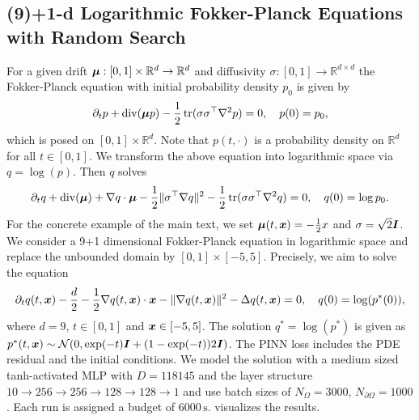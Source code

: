 \subsection{(9)+1-d Logarithmic Fokker-Planck Equations with Random Search}\label{sec:fokker10d-appendix}
For a given drift ${\bm{\mu}}: [0, 1]\times \mathbb R^d \to \mathbb R^d$ and diffusivity $\sigma:[0,1]\to\mathbb R^{d\times d}$
the Fokker-Planck equation with initial probability density $p_0$ is given by
\begin{equation*}
  \partial_t p 
  +
  \operatorname{div}({\bm{\mu}} p) 
  -
  \frac12\operatorname{tr}(\sigma \sigma^\top \nabla^2 p) 
  =
  0,
  \quad
  p(0)
  =
  p_0,
\end{equation*}
which is posed on $[0, 1]\times \mathbb R^d$.
Note that $p(t,\cdot)$ is a probability density on $\mathbb R^d$ for all $t\in[0,1]$. We transform the above equation into logarithmic 
space via $q=\log(p)$. Then $q$ solves
\begin{equation*}
  \partial_t q 
  + 
  \operatorname{div}({\bm{\mu}})
  +
  \nabla q \cdot {\bm{\mu}}
  -
  \frac12 \|\sigma^\top \nabla q\|^2
  -
  \frac12\operatorname{tr}(\sigma\sigma^\top\nabla^2q)
  =
  0,
  \quad
  q(0)
  =
  \log p_0.
\end{equation*}
For the concrete example of the main text, we set ${\bm{\mu}}(t, {\bm{x}})=-\frac12x$ and $\sigma = \sqrt{2}{\bm{I}}$. 
We consider a 9+1 dimensional Fokker-Planck equation in logarithmic space and replace the unbounded 
domain by $[0, 1]\times [-5, 5]$. Precisely, we aim to solve the 
equation
\begin{equation*}
  \partial_t q(t, {\bm{x}})
  -
  \frac{d}{2}
  -
  \frac12 \nabla q(t, {\bm{x}})\cdot {\bm{x}}
  -
  \| \nabla q(t, {\bm{x}}) \|^2
  -
  \Delta q(t, {\bm{x}})
  =
  0,
  \quad 
  q(0) = \log (p^*(0)),
\end{equation*}
where $d=9$, $t\in[0, 1]$ and ${\bm{x}}\in[-5, 5]$. The solution $q^*=\log(p^*)$ is
given as $p^*(t, {\bm{x}}) \sim \mathcal N (0, \exp(-t){\bm{I}} + (1-\exp(-t))2{\bm{I}})$.
The PINN loss includes the PDE residual and the initial conditions.
We model the solution with a medium sized tanh-activated 
MLP with $D=\num{118145}$ and the layer structure
$10 \to 256 \to 256 \to 128 \to 128 \to 1$ and use batch sizes of 
$N_{\Omega} = \num{3000}$, $N_{\partial\Omega} = \num{1000}$. Each run is
assigned a budget of $\num{6000}\,\text{s}$.  visualizes the results.

